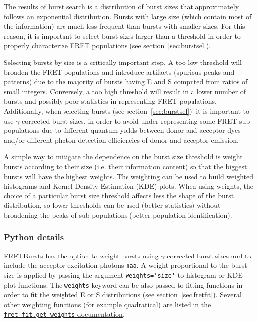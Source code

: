 The results of burst search is a distribution of burst sizes that approximately 
follows an exponential distribution.
Bursts with large size (which contain most of the information)
are much less frequent than bursts with smaller sizes. For this reason, it is 
important to select burst sizes larger than a threshold in order
to properly characterize FRET populations (see section~\ref{sec:burstsel}). 

Selecting bursts by size is a critically important step.
A too low threshold will broaden the FRET populations and introduce
artifacts (spurious peaks and patterns) due to the majority of bursts
having E and S computed from ratios of small integers. 
Conversely, a too high threshold will result in a lower number of bursts 
and possibly poor statistics in representing FRET populations.
Additionally, when selecting bursts (see section~\ref{sec:burstsel}), 
it is important to use $\gamma$-corrected burst sizes,
in order to avoid under-representing some FRET sub-populations
due to different quantum yields between donor and acceptor dyes and/or 
different photon detection efficiencies of donor and acceptor emission.

A simple way to mitigate the dependence on the burst size threshold is
weight bursts according to their size (i.e. their information content)
so that the biggest bursts will have the highest weights.
The weighting can be used to build weighted histograms and Kernel Density 
Estimation (KDE) plots. When using weights, the choice of a particular 
burst size threshold affects less the shape of the burst distribution,
so lower thresholds can be used (better statistics) without broadening 
the peaks of sub-populations (better population identification).

\subsubsection{Python details}
FRETBursts has the option to weight bursts using $\gamma$-corrected 
burst sizes and to include the acceptor excitation photons \verb|naa|.
A weight proportional to the burst size is applied by passing the argument 
\verb|weights='size'| to histogram or KDE plot functions. The \verb|weights|
keyword can be also passed to fitting functions in order to fit 
the weighted E or S distributions (see section~\ref{sec:fretfit}).
Several other weighting functions (for example quadratical) are listed in the
\href{http://fretbursts.readthedocs.org/en/latest/fret_fit.html#fretbursts.fret_fit.get_weights}{\texttt{fret\_fit.get\_weights} documentation}.

